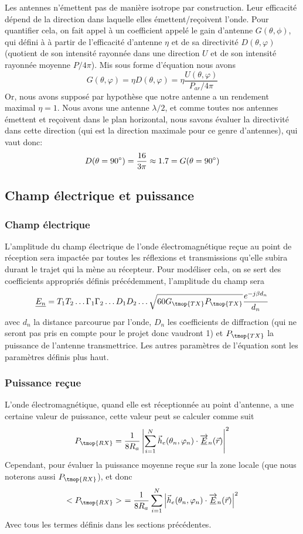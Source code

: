 Les antennes n'{\'e}mettent pas de mani{\`e}re isotrope par construction. Leur
efficacit{\'e} d{\'e}pend de la direction dans laquelle elles
{\'e}mettent/re{\c c}oivent l'onde. Pour quantifier cela, on fait appel {\`a}
un coefficient appel{\'e} le gain d'antenne $G (\theta, \phi)$, qui défini à
{\`a} partir de l'efficacité d'antenne $\eta$ et de sa directivit{\'e} $D (\theta, \varphi)$ (quotient de son intensit{\'e} rayonn{\'e}e
dans une direction $U$ et de son intensit{\'e} rayonn{\'e}e moyenne $P / 4
\pi$). Mis sous forme d'{\'e}quation nous avons
\[ G (\theta, \varphi) = \eta D (\theta, \varphi) = \eta \frac{U (\theta,
   \varphi)}{P_{a r} / 4 \pi} \]
Or, nous avons suppos{\'e} par hypoth{\`e}se que notre antenne a un rendement
maximal $\eta = 1$. Nous avons une antenne $\lambda / 2$, et comme toutes nos
antennes {\'e}mettent et re{\c c}oivent dans le plan horizontal, nous savons
{\'e}valuer la directivit{\'e} dans cette direction (qui est la direction
maximale pour ce genre d'antennes), qui vaut donc:
\[ D (\theta = 90\degree) = \frac{16}{3 \pi} \approx 1.7 = G
   (\theta = 90\degree )\]
   
\subsection{Champ {\'e}lectrique et puissance }

\subsubsection*{Champ électrique}
L'amplitude du champ {\'e}lectrique de l'onde {\'e}lectromagn{\'e}tique re{\c
c}ue au point de r{\'e}ception sera impact{\'e}e par toutes les r{\'e}flexions
et transmissions qu'elle subira durant le trajet qui la m{\`e}ne au
r{\'e}cepteur. Pour mod{\'e}liser cela, on se sert des coefficients
appropri{\'e}s d{\'e}finis pr{\'e}c{\'e}demment, l'amplitude du champ sera
\[ \underline{E_n} = T_1 T_2 \ldots \Gamma_1 \Gamma_2 \ldots D_1 D_2 \ldots
   \sqrt{60 G_{\tmop{TX}} P_{\tmop{TX}}} \frac{e^{- j \beta d_n}}{d_n} \]
avec $d_n$ la distance parcourue par l'onde, $D_n$ les coefficients de
diffraction (qui ne seront pas pris en compte pour le projet donc vaudront 1)
et $P_{\tmop{TX}}$ la puissance de l'antenne transmettrice. Les autres param{\`e}tres de
l'{\'e}quation sont les param{\`e}tres d{\'e}finis plus haut.

\subsubsection*{Puissance reçue}
L'onde {\'e}lectromagn{\'e}tique, quand elle est r{\'e}ceptionn{\'e}e au point
d'antenne, a une certaine valeur de puissance, cette valeur peut se calculer
comme suit
\[ P_{\tmop{RX}} = \frac{1}{8 R_a} \left| \sum_{i = 1}^N \vec{h}_e (\theta_n,
   \varphi_n) \cdot \overrightarrow{\underline{E}}_n (\vec{r}) \right|^2 \]
Cependant, pour {\'e}valuer la puissance moyenne re{\c c}ue sur la zone locale
(que nous noterons aussi $P_{\tmop{RX}}$), et donc
\[ < P_{\tmop{RX}} >\ = \frac{1}{8 R_a} \sum_{i = 1}^N \left| \vec{h}_e (\theta_n,
   \varphi_n) \cdot \overrightarrow{\underline{E}}_n (\vec{r}) \right|^2 \]
Avec tous les termes d{\'e}finis dans les sections pr{\'e}c{\'e}dentes.

\ 